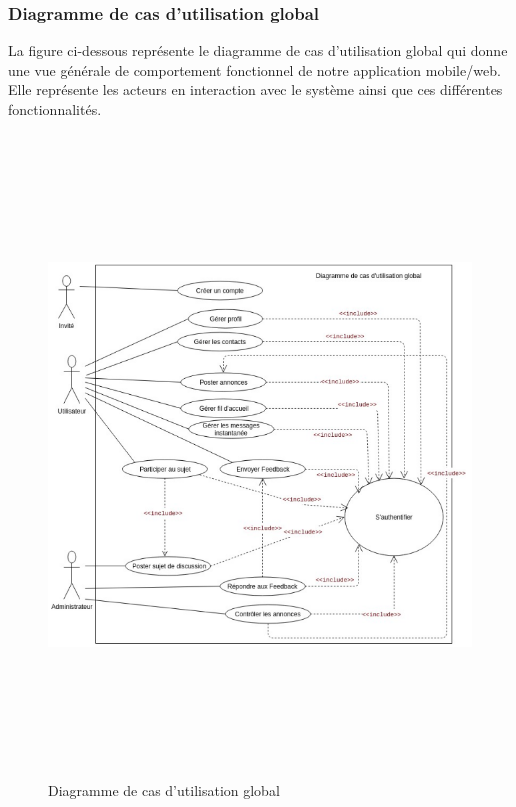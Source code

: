 \documentclass[11pt,a4paper,oneside]{book}
\begin{document}
	\subsubsection{Diagramme de cas d’utilisation global}
	La figure ci-dessous représente le diagramme de cas d’utilisation global qui donne une vue générale de comportement fonctionnel de notre application mobile/web. Elle représente les acteurs en interaction avec le système ainsi que ces différentes fonctionnalités.
	
	\begin{figure}[H]
		\centering
		\includegraphics[width=16cm, height=17cm]{Diagrammes/Cas_global}
		\caption{Diagramme de cas d’utilisation global}
		\label{fig:casglobal}
	\end{figure}
	
\end{document}
